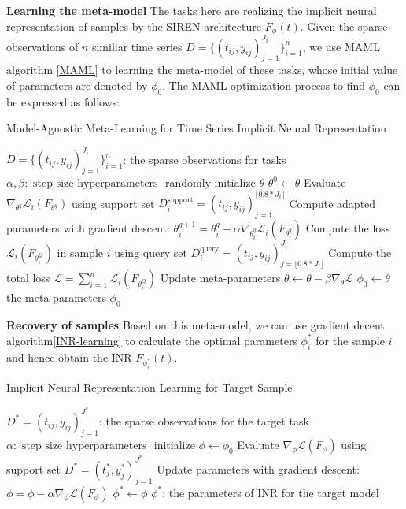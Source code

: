 \documentclass{article}
\begin{document}
\textbf{Learning the meta-model}
The tasks here are realizing the implicit neural representation of samples by the SIREN architecture $F_\phi(t)$.
Given the sparse observations of $n$ similiar time series $D=\{(t_{ij},y_{ij})_{j=1}^{J_i}\}_{i=1}^n$,
we use MAML algorithm \ref{MAML} to learning the meta-model of these tasks, 
whose initial value of parameters are denoted by $\phi_0$. 
The MAML optimization process to find $\phi_0$ can be expressed as follows:
\begin{algorithm}
	\renewcommand{\algorithmicrequire}{\textbf{Input:}}
	\renewcommand{\algorithmicensure}{\textbf{Output:}}
	\caption{Model-Agnostic Meta-Learning for Time Series Implicit Neural Representation}
	\label{MAML}
	\begin{algorithmic}
    \REQUIRE $D=\{(t_{ij},y_{ij})_{j=1}^{J_i}\}_{i=1}^n$: the sparse observations for tasks
    \REQUIRE $\alpha, \beta: \text { step size hyperparameters }$
		\STATE randomly initialize $\theta$
        \STATE $\theta^0 \gets \theta$
          \STATE Evaluate $\nabla_{\theta^q} \mathcal{L}_{i}\left(F_{\theta^q}\right)$ using support set $D_i^{\text{support}}=(t_{ij},y_{ij})_{j=1}^{\lfloor 0.8*J_i\rfloor }$
          \STATE Compute adapted parameters with gradient descent:
          $\theta_i^{q+1}=\theta_i^q-\alpha \nabla_{\theta_i^q} \mathcal{L}_{i}\left(F_{\theta_i^q}\right)$
        \ENDFOR
        \STATE Compute the loss $\mathcal{L}_{i}\left(F_{\theta_i^Q}\right)$ in sample $i$ using query set $D_i^{\text{query}}=(t_{ij},y_{ij})_{j=\lfloor 0.8*J_i\rfloor }^{J_i}$
      \ENDFOR
      \STATE Compute the total loss $\mathcal{L} = \sum_{i=1}^n \mathcal{L}_{i}\left(F_{\theta_i^Q}\right)$
      \STATE Update meta-parameters $\theta \leftarrow \theta-\beta \nabla_\theta \mathcal{L} $
    \ENDWHILE 
    \STATE $\phi_0 \gets \theta$
		\ENSURE the meta-parameters $\phi_0$
  \end{algorithmic}  
\end{algorithm}

\textbf{Recovery of samples}
Based on this meta-model, we can use gradient decent algorithm\ref{INR-learning} to calculate the optimal parameters $\phi^*_i$ for the sample $i$ and hence obtain the INR $F_{\phi^*_i}(t)$. 
\begin{algorithm}
	\renewcommand{\algorithmicrequire}{\textbf{Input:}}
	\renewcommand{\algorithmicensure}{\textbf{Output:}}
	\caption{Implicit Neural Representation Learning for Target Sample}
	\label{INR-learning}
	\begin{algorithmic}
    \REQUIRE $D^*=(t_{ij},y_{ij})_{j=1}^{J^*}$: the sparse observations for the target task
    \REQUIRE $\alpha: \text { step size hyperparameters }$
		\STATE initialize $\phi \gets \phi_0$
      \STATE Evaluate $\nabla_{\phi} \mathcal{L}\left(F_{\phi}\right)$ using support set $D^*=(t_{j}^*,y_{j}^*)_{j=1}^{J^*}$
      \STATE Update parameters with gradient descent:
      $\phi=\phi-\alpha \nabla_{\phi} \mathcal{L}\left(F_{\phi}\right)$
    \ENDWHILE 
    \STATE $\phi^* \gets \phi$
		\ENSURE $\phi^*$: the parameters of INR for the target model 
  \end{algorithmic}  
\end{algorithm}
\end{document}
